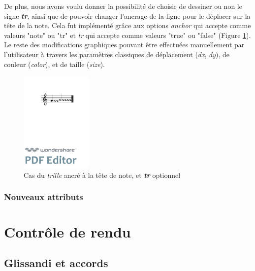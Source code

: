 \documentclass{article}
\newenvironment{gmncode}	{\vspace{-2mm}\small\verbatim}{\endverbatim\vspace{-2mm}}
\begin{document}
De plus, nous avons voulu donner la possibilité de choisir de dessiner ou non le signe \textit{\textbf{tr}}, ainsi que de pouvoir changer l'ancrage de la ligne pour le déplacer sur la tête de la note. Cela fut implémenté grâce aux options \emph{anchor} qui accepte comme valeurs "note" ou "tr" et \emph{tr} qui accepte comme valeurs "true" ou "false" (Figure \ref{fig:trillanchor}). Le reste des modifications graphiques pouvant être effectuées manuellement par l'utilisateur à travers les paramètres classiques de déplacement (\textit{dx}, \textit{dy}), de couleur (\textit{color}), et de taille (\textit{size}).

\begin{figure}[h]
\centering
\begin{gmncode}
[ \trill<tr="false", anchor="note">( {g} {a/2} ) ]
\end{gmncode}
\includegraphics[width=35mm]{img/trillanchor.pdf}
\caption{Cas du \emph{trille} ancré à la tête de note, et \textit{\textbf{tr}} optionnel}
\label{fig:trillanchor}
\end{figure}

\subsubsection{Nouveaux attributs}\label{subsubsec:attributs}



\section{Contr\^ole de rendu}\label{sec:controleRendu}

\subsection{Glissandi et accords}\label{subsec:glissandiAccords}
\end{document}
